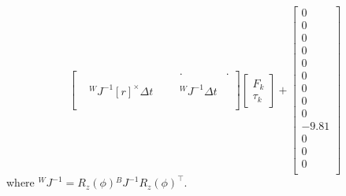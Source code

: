 \documentclass{article}
\begin{document}
\begin{equation*}
\begin{bmatrix}
		  &   &   &   & . & . \\
		  &   &   &   &   &   \\
		  & {}^WJ^{-1} [r]^\times \Delta t &   &   &  {}^WJ^{-1} \Delta t &   \\
		  &   &   &   &   &   \\
	\end{bmatrix}
	\begin{bmatrix}
	F_k\\
	\tau_k
	\end{bmatrix} +
	\begin{bmatrix}
	0\\
	0\\
	0\\
	0\\
	0\\
	0\\
	0\\
	0\\
	0\\
	-9.81\\
	0\\
	0\\
	0\\
	\end{bmatrix}
\end{equation*}
where $ {}^WJ^{-1} = R_z(\phi){}^BJ^{-1}R_z(\phi)^\top $. \\
\linebreak

    
\end{document}
